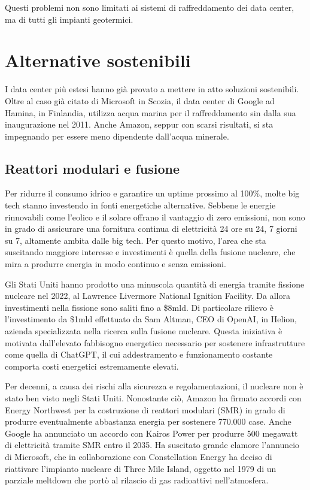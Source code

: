 \documentclass[12pt,a4paper,oneside]{book}
\begin{document}
Questi problemi non sono limitati ai sistemi di raffreddamento dei data center, ma di tutti gli impianti geotermici.

\section{Alternative sostenibili}

I data center più estesi hanno già provato a mettere in atto soluzioni sostenibili. Oltre al caso già citato di Microsoft in Scozia, il data center di Google ad Hamina, in Finlandia, utilizza acqua marina per il raffreddamento sin dalla sua inaugurazione nel 2011. Anche Amazon, seppur con scarsi risultati, si sta impegnando per essere meno dipendente dall'acqua minerale.

\subsection{Reattori modulari e fusione}
Per ridurre il consumo idrico e garantire un uptime prossimo al 100\%, molte big tech stanno investendo in fonti energetiche alternative. Sebbene le energie rinnovabili come l'eolico e il solare offrano il vantaggio di zero emissioni, non sono in grado di assicurare una fornitura continua di elettricità 24 ore su 24, 7 giorni su 7, altamente ambita dalle big tech. Per questo motivo, l'area che sta suscitando maggiore interesse e investimenti è quella della fusione nucleare, che mira a produrre energia in modo continuo e senza emissioni.

Gli Stati Uniti hanno prodotto una minuscola quantità di energia tramite fissione nucleare nel 2022, al Lawrence Livermore National Ignition Facility. Da allora investimenti nella fissione sono saliti fino a \$8mld. Di particolare rilievo è l'investimento da \$1mld effettuato da Sam Altman, CEO di OpenAI, in Helion, azienda specializzata nella ricerca sulla fusione nucleare. Questa iniziativa è motivata dall'elevato fabbisogno energetico necessario per sostenere infrastrutture come quella di ChatGPT, il cui addestramento e funzionamento costante comporta costi energetici estremamente elevati.

Per decenni, a causa dei rischi alla sicurezza e regolamentazioni, il nucleare non è stato ben visto negli Stati Uniti. Nonostante ciò, Amazon ha firmato accordi con Energy Northwest per la costruzione di reattori modulari (SMR) in grado di produrre eventualmente abbastanza energia per sostenere 770.000 case. Anche Google ha annunciato un accordo con Kairos Power per produrre 500 megawatt di elettricità tramite SMR entro il 2035.
Ha suscitato grande clamore l'annuncio di Microsoft, che in collaborazione con Constellation Energy ha deciso di riattivare l'impianto nucleare di Three Mile Island, oggetto nel 1979 di un parziale meltdown che portò al rilascio di gas radioattivi nell'atmosfera.
\end{document}
